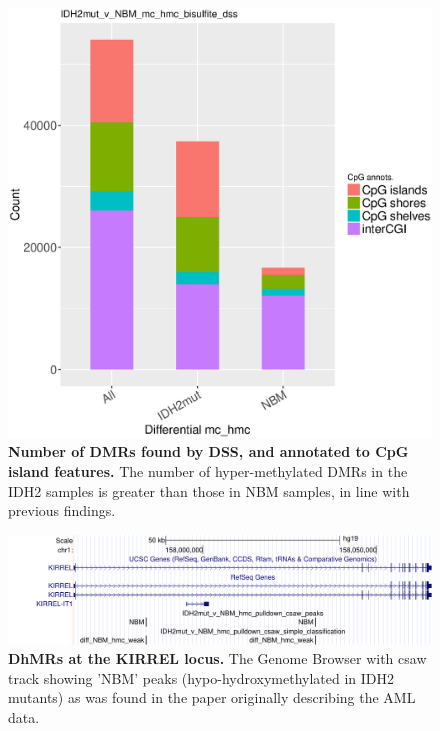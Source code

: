 \begin{figure}[ht!]
\centering
\includegraphics[width=1\textwidth]{chap5figs/figure5_9.eps}
\caption[Number of DMRs found by DSS, and annotated to CpG island features.]
{
\textbf{Number of DMRs found by DSS, and annotated to CpG island features.} The number of hyper-methylated DMRs in the IDH2 samples is greater than those in NBM samples, in line with previous findings.
}
\label{chap5:fig:9}
\end{figure}

\newpage

\begin{figure}[ht!]
\centering
\includegraphics[width=1\textwidth]{chap5figs/figure5_10.pdf}
\caption[DhMRs at the KIRREL locus.]
{
\textbf{DhMRs at the KIRREL locus.} The Genome Browser with csaw track showing 'NBM' peaks (hypo-hydroxymethylated in IDH2 mutants) as was found in the paper originally describing the AML data.
}
\label{chap5:fig:10}
\end{figure}

